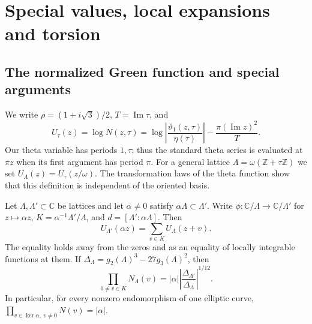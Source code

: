 \section{Special values, local expansions and torsion}
\subsection{The normalized Green function and special arguments}
We write $\rho=(1+i\sqrt3)/2$, $T=\operatorname{Im}\tau$, and
\[
 U_\tau(z)=\log N(z,\tau)
 =\log\left|\frac{\vartheta _1(z,\tau)}{\eta(\tau)}\right|
       -\frac{\pi(\operatorname{Im}z)^2}{T}.
\]
Our theta variable has periods $1,\tau$; thus the standard theta series
is evaluated at $\pi z$ when its first argument has period $\pi$.
For a general lattice $\Lambda=\omega(\mathbb Z+\tau\mathbb Z)$ we set
$U_\Lambda(z)=U_\tau(z/\omega)$. The transformation laws of the theta
function show that this definition is independent of the oriented basis.

\begin{proposition}\label{ari:C.1.1}
Let $\Lambda,\Lambda'\subset\mathbb C$ be lattices and let
$\alpha\ne0$ satisfy $\alpha\Lambda\subset\Lambda'$. Write
$\phi:\mathbb C/\Lambda\to\mathbb C/\Lambda'$ for $z\mapsto\alpha z$,
$K=\alpha^{-1}\Lambda'/\Lambda$, and
$d=[\Lambda':\alpha\Lambda]$. Then
\begin{equation}\label{ari:eq:cs-isogeny}
 U_{\Lambda'}(\alpha z)=\sum_{v\in K}U_\Lambda(z+v).
\end{equation}
The equality holds away from the zeros and as an equality of locally
integrable functions at them. If $\Delta_\Lambda=g_2(\Lambda)^3-
27g_3(\Lambda)^2$, then
\[
 \prod_{0\ne v\in K}N_\Lambda(v)
 =|\alpha|\left|\frac{\Delta_{\Lambda'}}{\Delta_\Lambda}\right|^{1/12}.
\]
In particular, for every nonzero endomorphism of one elliptic curve,
$\prod_{v\in\ker\alpha,\ v\ne0}N(v)=|\alpha|$.
\end{proposition}

